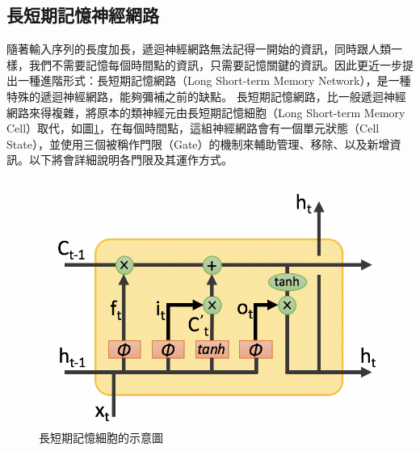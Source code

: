 \subsection{長短期記憶神經網路}
\label{LSTM}
隨著輸入序列的長度加長，遞迴神經網路無法記得一開始的資訊，同時跟人類一樣，我們不需要記憶每個時間點的資訊，只需要記憶關鍵的資訊。因此更近一步提出一種進階形式：長短期記憶網路（Long Short-term Memory
Network）\cite{gers2001long}，是一種特殊的遞迴神經網路，能夠彌補之前的缺點。
長短期記憶網路，比一般遞迴神經網路來得複雜，將原本的類神經元由長短期記憶細胞（Long
Short-term Memory Cell）取代，如圖\ref{fig:ch2_lstm}，在每個時間點，這組神經網路會有一個單元狀態（Cell
State），並使用三個被稱作門限（Gate）的機制來輔助管理、移除、以及新增資訊。以下將會詳細說明各門限及其運作方式。
\begin{figure}[ht]
\centering
\includegraphics[scale=0.5]{images/ch2_lstm.png}
\caption{長短期記憶細胞的示意圖\cite{shen2016}} \label{fig:ch2_lstm}
\end{figure}
